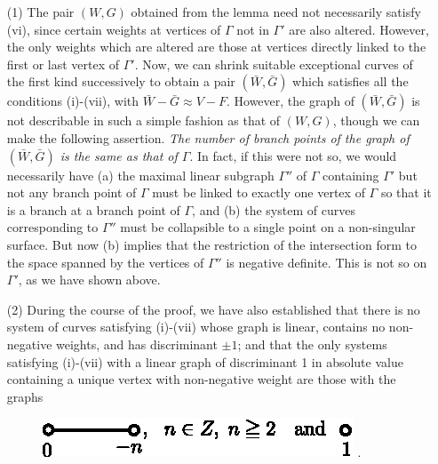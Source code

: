 \begin{remarks*}
\begin{itemize}
\item[(1)] The pair $(W, G)$ obtained from the lemma need not necessarily satisfy (vi), since certain weights at vertices of $\Gamma$ not in $\Gamma'$ are also altered. However, the only weights which are altered are those at vertices directly linked to the first or last vertex of $\Gamma'$. Now, we can shrink suitable exceptional curves of the first kind successively to obtain a pair $(\bar{W}, \bar{G})$ which satisfies all the conditions (i)-(vii), with $\bar{W}- \bar{G} \approx V - F$. However, the graph of $(\bar W, \bar G)$ is not describable in such a simple fashion as that of $(W, G)$, though we can make the following assertion. {\em The number of branch points of the graph of $(\bar{W},\bar{G})$ is the same as that of $\Gamma$}. In fact, if this were not so, we would necessarily have (a) the maximal linear subgraph $\Gamma''$ of $\Gamma$ containing $\Gamma'$ but not any branch point of $\Gamma$ must be linked to exactly one vertex of $\Gamma$ so that it is a branch at a branch point of $\Gamma$, and (b) the system of curves corresponding to $\Gamma''$ must be collapsible to a single point on a non-singular surface. But now (b) implies that the restriction of the intersection form to the space spanned by the vertices of $\Gamma''$ is negative definite. This is not so on $\Gamma'$, as we have shown above.

\item[(2)] During the course of the proof, we have also established that there is no system of curves satisfying (i)-(vii) whose graph is linear, contains no non-negative weights, and has discriminant $\pm 1$; and that the only systems satisfying (i)-(vii) with a linear graph of discriminant 1 in absolute value containing a unique vertex with non-negative weight are those with the graphs 
\begin{figure}[H]
\centering 
\includegraphics{fig8.eps}\raisebox{8pt} . 
\end{figure}

\end{itemize}
\end{remarks*}

